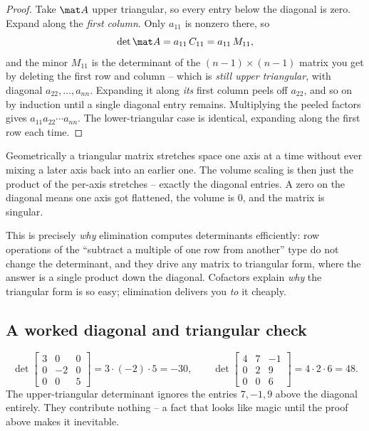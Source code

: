 \begin{proof}
Take $\mat A$ upper triangular, so every entry below the diagonal is zero. Expand along the
\emph{first column}. Only $a_{11}$ is nonzero there, so
\[
\det\mat A = a_{11}\,C_{11}=a_{11}\,M_{11},
\]
and the minor $M_{11}$ is the determinant of the $(n-1)\times(n-1)$ matrix you get by deleting the
first row and column -- which is \emph{still upper triangular}, with diagonal $a_{22},\dots,a_{nn}$.
Expanding it along \emph{its} first column peels off $a_{22}$, and so on by induction until a single
diagonal entry remains. Multiplying the peeled factors gives $a_{11}a_{22}\cdots a_{nn}$. The
lower-triangular case is identical, expanding along the first row each time.
\end{proof}

\begin{intuitionbox}
Geometrically a triangular matrix stretches space one axis at a time without ever mixing a later axis
back into an earlier one. The volume scaling is then just the product of the per-axis stretches --
exactly the diagonal entries. A zero on the diagonal means one axis got flattened, the volume is $0$,
and the matrix is singular.
\end{intuitionbox}

This is precisely \emph{why} elimination computes determinants efficiently: row operations of the
``subtract a multiple of one row from another'' type do not change the determinant, and they drive any
matrix to triangular form, where the answer is a single product down the diagonal. Cofactors explain
\emph{why} the triangular form is so easy; elimination delivers you \emph{to} it cheaply.

\subsection{A worked diagonal and triangular check}

\[
\det\begin{bmatrix} 3 & 0 & 0 \\ 0 & -2 & 0 \\ 0 & 0 & 5 \end{bmatrix}=3\cdot(-2)\cdot5=-30,
\qquad
\det\begin{bmatrix} 4 & 7 & -1 \\ 0 & 2 & 9 \\ 0 & 0 & 6 \end{bmatrix}=4\cdot2\cdot6=48.
\]
The upper-triangular determinant ignores the entries $7,-1,9$ above the diagonal entirely. They
contribute nothing -- a fact that looks like magic until the proof above makes it inevitable.

